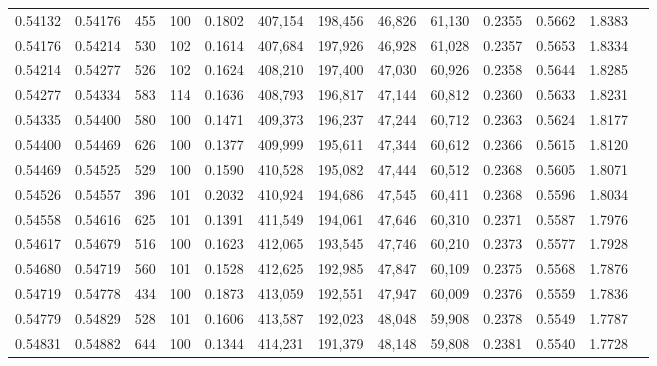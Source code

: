 \begin{tabular}{rrrrrrrrrrrrr}
0.54132 & 0.54176 &   455 & 100 &                                     0.1802 & 407,154 & 198,456 &  46,826 &  61,130 & 0.2355 & 0.5662 & 1.8383 \\
0.54176 & 0.54214 &   530 & 102 &                                     0.1614 & 407,684 & 197,926 &  46,928 &  61,028 & 0.2357 & 0.5653 & 1.8334 \\
0.54214 & 0.54277 &   526 & 102 &                                     0.1624 & 408,210 & 197,400 &  47,030 &  60,926 & 0.2358 & 0.5644 & 1.8285 \\
0.54277 & 0.54334 &   583 & 114 &                                     0.1636 & 408,793 & 196,817 &  47,144 &  60,812 & 0.2360 & 0.5633 & 1.8231 \\
0.54335 & 0.54400 &   580 & 100 &                                     0.1471 & 409,373 & 196,237 &  47,244 &  60,712 & 0.2363 & 0.5624 & 1.8177 \\
0.54400 & 0.54469 &   626 & 100 &                                     0.1377 & 409,999 & 195,611 &  47,344 &  60,612 & 0.2366 & 0.5615 & 1.8120 \\
0.54469 & 0.54525 &   529 & 100 &                                     0.1590 & 410,528 & 195,082 &  47,444 &  60,512 & 0.2368 & 0.5605 & 1.8071 \\
0.54526 & 0.54557 &   396 & 101 &                                     0.2032 & 410,924 & 194,686 &  47,545 &  60,411 & 0.2368 & 0.5596 & 1.8034 \\
0.54558 & 0.54616 &   625 & 101 &                                     0.1391 & 411,549 & 194,061 &  47,646 &  60,310 & 0.2371 & 0.5587 & 1.7976 \\
0.54617 & 0.54679 &   516 & 100 &                                     0.1623 & 412,065 & 193,545 &  47,746 &  60,210 & 0.2373 & 0.5577 & 1.7928 \\
0.54680 & 0.54719 &   560 & 101 &                                     0.1528 & 412,625 & 192,985 &  47,847 &  60,109 & 0.2375 & 0.5568 & 1.7876 \\
0.54719 & 0.54778 &   434 & 100 &                                     0.1873 & 413,059 & 192,551 &  47,947 &  60,009 & 0.2376 & 0.5559 & 1.7836 \\
0.54779 & 0.54829 &   528 & 101 &                                     0.1606 & 413,587 & 192,023 &  48,048 &  59,908 & 0.2378 & 0.5549 & 1.7787 \\
0.54831 & 0.54882 &   644 & 100 &                                     0.1344 & 414,231 & 191,379 &  48,148 &  59,808 & 0.2381 & 0.5540 & 1.7728 \\

\end{tabular}
